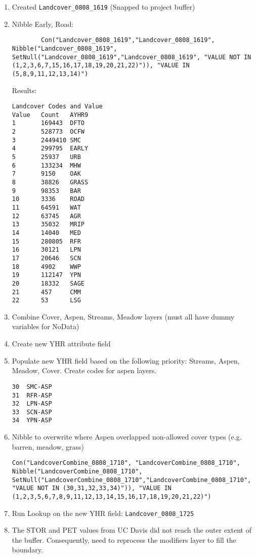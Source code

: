\begin{enumerate}
\begin{enumerate}
        \item Created \lstinline{Landcover_0808_1619} (Snapped to project buffer)
        \item Nibble Early, Road: \lstset{language=SQL}
        \begin{lstlisting} 
        Con("Landcover_0808_1619","Landcover_0808_1619", Nibble("Landcover_0808_1619", SetNull("Landcover_0808_1619","Landcover_0808_1619", "VALUE NOT IN (1,2,3,6,7,15,16,17,18,19,20,21,22)")), "VALUE IN (5,8,9,11,12,13,14)") 
        \end{lstlisting} \lstset{language=Python}
            Results:
            \begin{verbatim} 
Landcover Codes and Value
Value   Count   AYHR9
1       169443  DFTO
2       528773  OCFW
3       2449410 SMC
4       299795  EARLY
5       25937   URB
6       133234  MHW
7       9150    OAK
8       38826   GRASS
9       98353   BAR
10      3336    ROAD
11      64591   WAT
12      63745   AGR
13      35032   MRIP
14      14040   MED
15      280805  RFR
16      30121   LPN
17      20646   SCN
18      4902    WWP
19      112147  YPN
20      18332   SAGE
21      457     CMM
22      53      LSG
            \end{verbatim}
        \item Combine Cover, Aspen, Streams, Meadow layers (must all have dummy variables for NoData)
        \item Create new YHR attribute field
        \item Populate new YHR field based on the following priority: Streams, Aspen, Meadow, Cover. Create codes for aspen layers.
                \begin{verbatim}
30  SMC-ASP
31  RFR-ASP
32  LPN-ASP
33  SCN-ASP
34  YPN-ASP
\end{verbatim}
        \item Nibble to overwrite where Aspen overlapped non-allowed cover types (e.g. barren, meadow, grass)
        \lstset{language=SQL, showstringspaces=false} 
        \begin{lstlisting}
Con("LandcoverCombine_0808_1710", "LandcoverCombine_0808_1710", Nibble("LandcoverCombine_0808_1710", SetNull("LandcoverCombine_0808_1710","LandcoverCombine_0808_1710", "VALUE NOT IN (30,31,32,33,34)")), "VALUE IN (1,2,3,5,6,7,8,9,11,12,13,14,15,16,17,18,19,20,21,22)") 
        \end{lstlisting} \lstset{language=Python}
        \item Run Lookup on the new YHR field: \lstinline{Landcover_0808_1725}
        \item The STOR and PET values from UC Davis did not reach the outer extent of the buffer. Consequently, need to reprocess the modifiers layer to fill the boundary.

\end{enumerate}
\end{enumerate}
